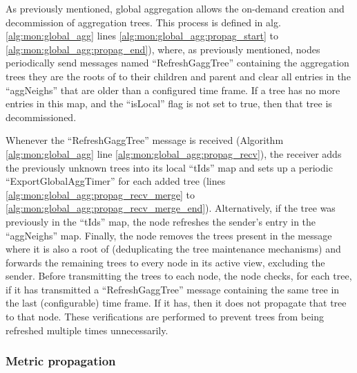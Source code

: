 As previously mentioned, global aggregation allows the on-demand creation and decommission of aggregation trees. This process is defined in alg. \ref{alg:mon:global_agg} lines \ref{alg:mon:global_agg:propag_start} to \ref{alg:mon:global_agg:propag_end}), where, as previously mentioned, nodes periodically send messages named ``RefreshGaggTree'' containing the aggregation trees they are the roots of to their children and parent and clear all entries in the ``aggNeighs'' that are older than a configured time frame. If a tree has no more entries in this map, and the ``isLocal'' flag is not set to true, then that tree is decommissioned.


Whenever the ``RefreshGaggTree'' message is received (Algorithm \ref{alg:mon:global_agg} line \ref{alg:mon:global_agg:propag_recv}), the receiver adds the previously unknown trees into its local ``tIds'' map and sets up a periodic ``ExportGlobalAggTimer'' for each added tree (lines \ref{alg:mon:global_agg:propag_recv_merge} to \ref{alg:mon:global_agg:propag_recv_merge_end}). Alternatively, if the tree was previously in the ``tIds'' map, the node refreshes the sender's entry in the ``aggNeighs'' map. Finally, the node removes the trees present in the message where it is also a root of (deduplicating the tree maintenance mechanisms) and forwards the remaining trees to every node in its active view, excluding the sender. Before transmitting the trees to each node, the node checks, for each tree, if it has transmitted a ``RefreshGaggTree'' message containing the same tree in the last (configurable) time frame. If it has, then it does not propagate that tree to that node. These verifications are performed to prevent trees from being refreshed multiple times unnecessarily. 

\subsubsection{Metric propagation}

